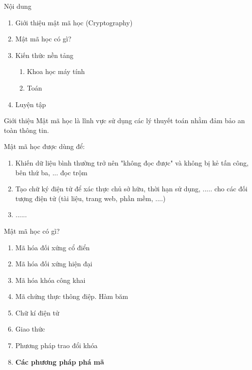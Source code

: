 \begin{frame}
    \titlepage
\end{frame}

\begin{frame}{Nội dung}
\begin{enumerate}
    \item Giới thiệu mật mã học (Cryptography)
    \item Mật mã học có gì?
    \item Kiến thức nền tảng
    \begin{enumerate}
        \item Khoa học máy tính
        \item Toán
    \end{enumerate}
\item Luyện tập
    \end{enumerate}
\end{frame}
\begin{frame}{Giới thiệu}
    Mật mã học là lĩnh vực sử dụng các lý thuyết toán nhằm đảm bảo an toàn thông tin.
    
    Mật mã học được dùng để: \begin{enumerate}
        \item Khiến dữ liệu bình thường trở nên "không đọc được" và không bị kẻ tấn công, bên thứ ba, ... đọc trộm
        \item Tạo chữ ký điện tử để xác thực chủ sở hữu, thời hạn sử dụng, ..... cho các đối tượng điện tử (tài liệu, trang web, phần mềm, ....)
        \item ......
    \end{enumerate}
\end{frame}

\begin{frame}{Mật mã học có gì?}
\begin{enumerate}
    \item Mã hóa đối xứng cổ điển
    \item Mã hóa đối xứng hiện đại
    \item Mã hóa khóa công khai
    \item Mã chứng thực thông điệp. Hàm băm
    \item Chữ kí điện tử
    \item Giao thức
    \item Phương pháp trao đổi khóa
    \item \textbf{Các phương pháp phá mã}
\end{enumerate}
\end{frame}


